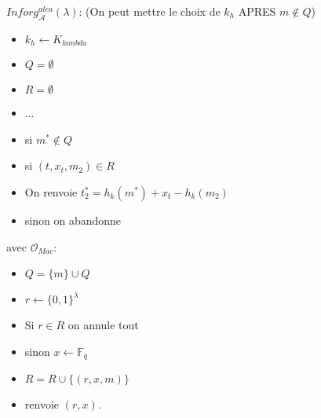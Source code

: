 \documentclass[12pt]{article}
\theoremstyle{plain}
\theoremstyle{definition}
\theoremstyle{remark}
\newcommand{\A}{\mathcal{A}}
\newcommand{\Or}{\mathcal{O}}
\begin{document}
$Inforg_{\A}^{alea}(\lambda)$: (On peut mettre le choix de $k_h$ APRES $m\notin Q$)
\begin{itemize}
    \item $k_h\leftarrow K_{lambda}$
    \item $Q=\emptyset$
    \item $R=\emptyset$
    \item ...
    \item si $m^*\notin Q$
    \item si $(t, x_t, m_2)\in R$
    \item On renvoie $t_2^*=h_k(m^*)+x_t-h_k(m_2)$
    \item sinon on abandonne
\end{itemize}
avec $\Or_{Mac}$:
\begin{itemize}
    \item $Q=\{m\}\cup Q$
    \item $r\leftarrow\{0,1\}^{\lambda}$
    \item Si $r\in R$ on annule tout
    \item sinon $x\leftarrow \mathbb{F}_q$
    \item $R=R\cup\{(r,x,m)\}$
    \item renvoie $(r,x)$.
\end{itemize}
\end{document}
